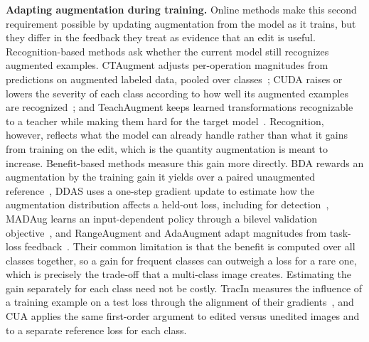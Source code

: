 \noindent\textbf{Adapting augmentation during training.} Online methods make this second requirement possible by updating augmentation from the model as it trains, but they differ in the feedback they treat as evidence that an edit is useful. Recognition-based methods ask whether the current model still recognizes augmented examples. CTAugment adjusts per-operation magnitudes from predictions on augmented labeled data, pooled over classes~\cite{berthelot2020}; CUDA raises or lowers the severity of each class according to how well its augmented examples are recognized~\cite{ahn2023cuda}; and TeachAugment keeps learned transformations recognizable to a teacher while making them hard for the target model~\cite{suzuki2022teach}. Recognition, however, reflects what the model can already handle rather than what it gains from training on the edit, which is the quantity augmentation is meant to increase. Benefit-based methods measure this gain more directly. BDA rewards an augmentation by the training gain it yields over a paired unaugmented reference~\cite{lu2023bda}, DDAS uses a one-step gradient update to estimate how the augmentation distribution affects a held-out loss, including for detection~\cite{liu2021ddas}, MADAug learns an input-dependent policy through a bilevel validation objective~\cite{hou2023madaug}, and RangeAugment and AdaAugment adapt magnitudes from task-loss feedback~\cite{mehta2022rangeaugment,yang2025adaaugment}. Their common limitation is that the benefit is computed over all classes together, so a gain for frequent classes can outweigh a loss for a rare one, which is precisely the trade-off that a multi-class image creates. Estimating the gain separately for each class need not be costly. TracIn measures the influence of a training example on a test loss through the alignment of their gradients~\cite{pruthi2020tracin}, and CUA applies the same first-order argument to edited versus unedited images and to a separate reference loss for each class.

